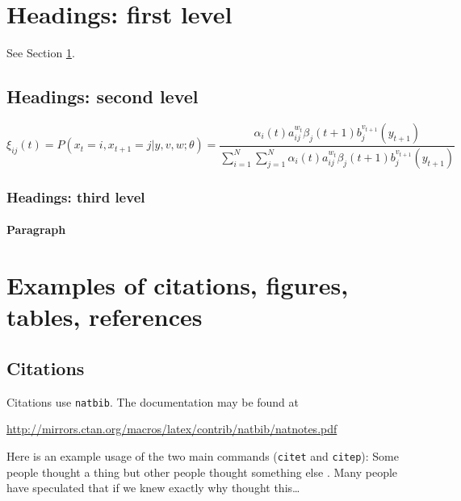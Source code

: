 \documentclass{article}
\begin{document}
\section{Headings: first level}
\label{sec:headings}

\lipsum[4] See Section \ref{sec:headings}.

\subsection{Headings: second level}
\lipsum[5]
\begin{equation} 
	\xi _{ij}(t)=P(x_{t}=i,x_{t+1}=j|y,v,w;\theta)= {\frac {\alpha _{i}(t)a^{w_t}_{ij}\beta _{j}(t+1)b^{v_{t+1}}_{j}(y_{t+1})}{\sum _{i=1}^{N} \sum _{j=1}^{N} \alpha _{i}(t)a^{w_t}_{ij}\beta _{j}(t+1)b^{v_{t+1}}_{j}(y_{t+1})}}
\end{equation}



\subsubsection{Headings: third level}
\lipsum[6]

\paragraph{Paragraph}
\lipsum[7]



\section{Examples of citations, figures, tables, references}
\label{sec:others}

\subsection{Citations}
Citations use \verb+natbib+. The documentation may be found at
\begin{center}
	\url{http://mirrors.ctan.org/macros/latex/contrib/natbib/natnotes.pdf}
\end{center}

Here is an example usage of the two main commands (\verb+citet+ and \verb+citep+): Some people thought a thing \citep{kour2014real, hadash2018estimate} but other people thought something else \citep{kour2014fast}. Many people have speculated that if we knew exactly why \citet{kour2014fast} thought this\dots
\end{document}
